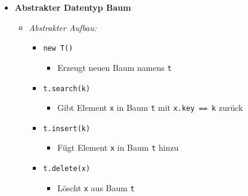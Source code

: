 \begin{itemize}
\pagebreak

            \item \textbf{Abstrakter Datentyp Baum}
                \begin{itemize}
                    \item \textit{Abstrakter Aufbau:}
                        \begin{itemize}
                            \item \texttt{new T()}
                                \begin{itemize}
                                    \item Erzeugt neuen Baum namens \texttt{t}
                                \end{itemize}

                            \item \texttt{t.search(k)}
                                \begin{itemize}
                                    \item Gibt Element \texttt{x} in Baum \texttt{t} mit \texttt{x.key == k} zurück
                                \end{itemize}
                            
                            \item \texttt{t.insert(k)}
                                \begin{itemize}
                                    \item Fügt Element \texttt{x} in Baum \texttt{t} hinzu
                                \end{itemize}
                            
                            \item \texttt{t.delete(x)}
                                \begin{itemize}
                                    \item Löscht \texttt{x} aus Baum \texttt{t}
                                \end{itemize}
                        \end{itemize}


\end{itemize}
\end{itemize}
